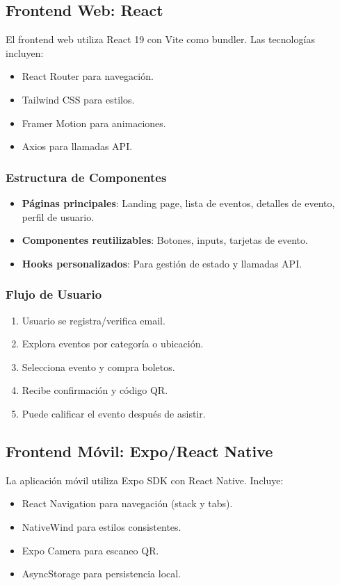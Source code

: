 \subsection{Frontend Web: React}
El frontend web utiliza React 19 con Vite como bundler. Las tecnologías incluyen:
\begin{itemize}
\item React Router para navegación.
\item Tailwind CSS para estilos.
\item Framer Motion para animaciones.
\item Axios para llamadas API.
\end{itemize}

\subsubsection{Estructura de Componentes}
\begin{itemize}
\item \textbf{Páginas principales}: Landing page, lista de eventos, detalles de evento, perfil de usuario.
\item \textbf{Componentes reutilizables}: Botones, inputs, tarjetas de evento.
\item \textbf{Hooks personalizados}: Para gestión de estado y llamadas API.
\end{itemize}

\subsubsection{Flujo de Usuario}
\begin{enumerate}
\item Usuario se registra/verifica email.
\item Explora eventos por categoría o ubicación.
\item Selecciona evento y compra boletos.
\item Recibe confirmación y código QR.
\item Puede calificar el evento después de asistir.
\end{enumerate}

\subsection{Frontend Móvil: Expo/React Native}
La aplicación móvil utiliza Expo SDK con React Native. Incluye:
\begin{itemize}
\item React Navigation para navegación (stack y tabs).
\item NativeWind para estilos consistentes.
\item Expo Camera para escaneo QR.
\item AsyncStorage para persistencia local.
\end{itemize}

